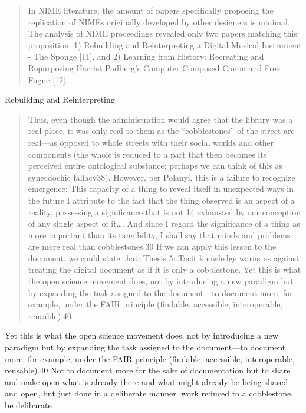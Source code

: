 \begin{quote}
    In NIME literature, the amount of papers specifically proposing the replication of NIMEs originally developed by other designers is minimal. The analysis of NIME proceedings revealed only two papers matching this proposition: 1) Rebuilding and Reinterpreting a Digital Musical Instrument - The Sponge [11], and 2) Learning from History: Recreating and Repurposing Harriet Padberg’s Computer Composed Canon and Free Fugue [12].
\end{quote}

Rebuilding and Reinterpreting



\citet{burns_documents_2021}
\begin{quote}
    Thus, even though the administration would agree
    that the library was a real place, it was only real to them as the “cobblestones” of the street are
    real—as opposed to whole streets with their social worlds and other components (the whole is
    reduced to a part that then becomes its perceived entire ontological substance; perhaps we can
    think of this as synecdochic fallacy38). However, per Polanyi, this is a failure to recognize
    emergence:
    This capacity of a thing to reveal itself in unexpected ways in the future I attribute to the
    fact that the thing observed is an aspect of a reality, possessing a significance that is not
    14
    exhausted by our conception of any single aspect of it…. And since I regard the
    significance of a thing as more important than its tangibility, I shall say that minds and
    problems are more real than cobblestones.39
    If we can apply this lesson to the document, we could state that:
    Thesis 5: Tacit knowledge warns us against treating the digital document as if it is only a
    cobblestone.
    Yet this is what the open science movement does, not by introducing a new paradigm but
    by expanding the task assigned to the document—to document more, for example, under the
    FAIR principle (findable, accessible, interoperable, reusable).40
\end{quote}

Yet this is what the open science movement does, not by introducing a new paradigm but
by expanding the task assigned to the document—to document more, for example, under the
FAIR principle (findable, accessible, interoperable, reusable).40
Not to document more for the sake of documentation but to share and make open what is already there and what might already be being shared and open, but just done in a deliberate manner.
work reduced to a cobblestone, be delibarate


